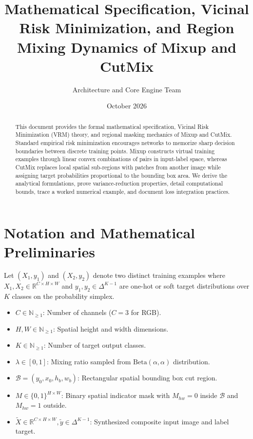 \documentclass[11pt,a4paper]{article}
\title{\textbf{Mathematical Specification, Vicinal Risk Minimization, and Region Mixing Dynamics of Mixup and CutMix}}
\author{Architecture and Core Engine Team}
\date{October 2026}
\theoremstyle{definition}
\begin{document}
\maketitle

\begin{abstract}
This document provides the formal mathematical specification, Vicinal Risk Minimization (VRM) theory, and regional masking mechanics of Mixup and CutMix. Standard empirical risk minimization encourages networks to memorize sharp decision boundaries between discrete training points. Mixup constructs virtual training examples through linear convex combinations of pairs in input-label space, whereas CutMix replaces local spatial sub-regions with patches from another image while assigning target probabilities proportional to the bounding box area. We derive the analytical formulations, prove variance-reduction properties, detail computational bounds, trace a worked numerical example, and document loss integration practices.
\end{abstract}

\section{Notation and Mathematical Preliminaries}

Let $(X_1, y_1)$ and $(X_2, y_2)$ denote two distinct training examples where $X_1, X_2 \in \mathbb{R}^{C \times H \times W}$ and $y_1, y_2 \in \Delta^{K-1}$ are one-hot or soft target distributions over $K$ classes on the probability simplex.

\begin{itemize}
    \item $C \in \mathbb{N}_{\ge 1}$: Number of channels ($C = 3$ for RGB).
    \item $H, W \in \mathbb{N}_{\ge 1}$: Spatial height and width dimensions.
    \item $K \in \mathbb{N}_{\ge 1}$: Number of target output classes.
    \item $\lambda \in [0, 1]$: Mixing ratio sampled from $\text{Beta}(\alpha, \alpha)$ distribution.
    \item $\mathcal{B} = (y_0, x_0, h_b, w_b)$: Rectangular spatial bounding box cut region.
    \item $M \in \{0, 1\}^{H \times W}$: Binary spatial indicator mask with $M_{hw} = 0$ inside $\mathcal{B}$ and $M_{hw} = 1$ outside.
    \item $\tilde{X} \in \mathbb{R}^{C \times H \times W}, \tilde{y} \in \Delta^{K-1}$: Synthesized composite input image and label target.
\end{itemize}
\end{document}
